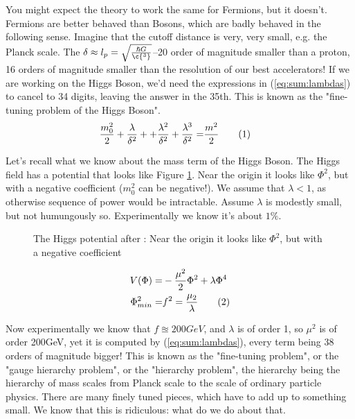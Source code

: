 \documentclass[]{article}
\newcommand\numberthis{\addtocounter{equation}{1}\tag{\theequation}}
\begin{document}
You might expect the theory to work the same for Fermions, but it doesn't. Fermions are better behaved than Bosons, which are badly behaved in the following sense. Imagine that the cutoff distance is very, very small, e.g. the Planck scale. The $\delta \approx l_p = \sqrt{\frac{\hslash G}{\c{^3}}}$--20 order of magnitude smaller than a proton, 16 orders of magnitude smaller than the resolution of our best accelerators! If we are working on the Higgs Boson, we'd need the expressions in (\ref{eq:sum:lambdas}) to cancel to 34 digits, leaving the answer in the 35th. This is known as the "fine-tuning problem of the Higgs Boson".
\begin{align*}
	\frac{m_0^2}{2} + \frac{\lambda}{\delta^2} +  + \frac{\lambda^2}{\delta^2}  + \frac{\lambda^3}{\delta^2} =& \frac{m^2}{2}\numberthis\label{eq:sum:lambdas}
\end{align*}

Let's recall what we know about the mass term of the Higgs Boson. The Higgs field has a potential that looks like Figure \ref{fig:higgs-potential}. Near the origin it looks like $\Phi^2$, but with a negative coefficient ($m_0^2$ can be negative!). We assume that $\lambda<1$, as otherwise sequence of power would be intractable. Assume $\lambda$ is modestly small, but not humungously so. Experimentally we know it's about $1\%$.

\begin{figure}[H]
	\begin{center}
		\caption[The Higgs potential]{The Higgs potential after \cite{susskind2010standard}: Near the origin it looks like $\Phi^2$, but with a negative coefficient }\label{fig:higgs-potential}
	\end{center}
\end{figure}

\begin{align*}
	V(\Phi) =& - \frac{\mu^2}{2} \Phi^2 + \lambda \Phi^4\\
	\Phi_{min}^2 =& f^2 = \frac{\mu_2}{\lambda} \numberthis \label{eg:higgs:minimum}
\end{align*}

Now experimentally we know that $f\approxeq200GeV$, and $\lambda$ is of order 1, so $\mu^2$ is of order 200GeV, yet it is computed by (\ref{eq:sum:lambdas}), every term being 38 orders of magnitude bigger! This is known as the "fine-tuning problem", or the "gauge hierarchy problem", or the "hierarchy problem", the hierarchy being the hierarchy of mass scales from Planck scale to the scale of ordinary particle physics. There are many finely tuned pieces, which have to add up to something small. We know that this is ridiculous: what do we do about that.
\end{document}
